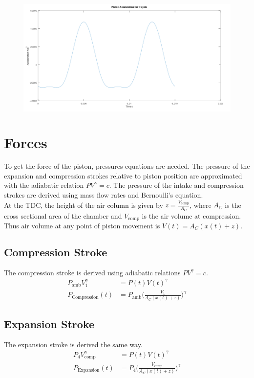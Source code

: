 \documentclass[10pt,a4paper]{article}
\begin{document}
	\begin{figure}[H]
		\centering
		\includegraphics[width=\textwidth]{Selection_362.png}
	\end{figure}
\newpage

\section*{Forces}
To get the force of the piston, pressures equations are needed. The pressure of the expansion and compression strokes relative to piston position are approximated with the adiabatic relation $P V^{\gamma} = c$.
The pressure of the intake and compression strokes are derived using mass flow rates and Bernoulli's equation.\\
At the TDC, the height of the air column is given by $z = \frac{V_{\text{comp}}}{A_C}$, where $A_C$ is the cross sectional area of the chamber and $V_{\text{comp}}$ is the air volume at compression.\\ Thus air volume at any point of piston movement is $V(t) = A_C (x(t)+z)$.
\subsection*{Compression Stroke}
The compression stroke is derived using adiabatic relations $P V^{\gamma} = c$.
\begin{align*}
	P_{\text{amb}} V_1^{\gamma} &= P(t) V(t)^{\gamma}\\
	P_{\text{Compression}}(t) &= P_{\text{amb}} \Big( \frac{V_1}{A_C (x(t)+z)} \Big)^{\gamma}
\end{align*}
\subsection*{Expansion Stroke} 
The expansion stroke is derived the same way.
\begin{align*}
	P_{4} V_{\text{comp}}^{\gamma} &= P(t) V(t)^{\gamma}\\
	P_{\text{Expansion}}(t) &= P_{4} \Big( \frac{V_{\text{comp}}}{A_C (x(t)+z)} \Big)^{\gamma}
\end{align*}
\end{document}
